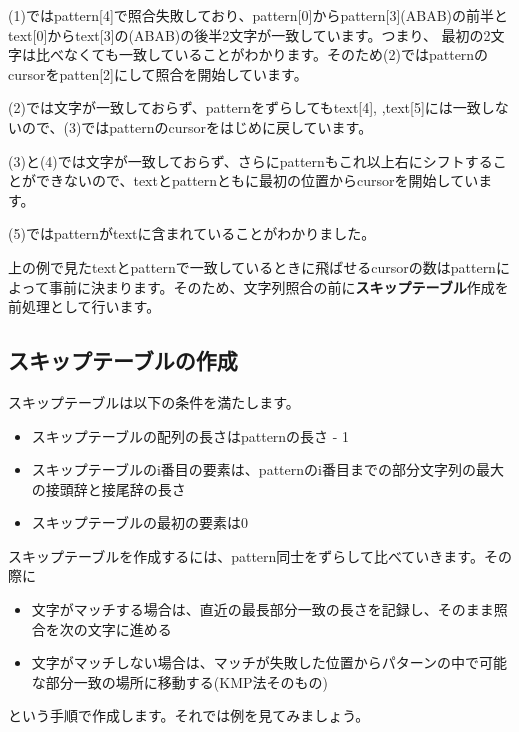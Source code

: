 \documentclass{jlreq}
\begin{document}
\vspace{0.5cm}

(1)ではpattern[4]で照合失敗しており、pattern[0]からpattern[3](ABAB)の前半とtext[0]からtext[3]の(ABAB)の後半2文字が一致しています。つまり、
最初の2文字は比べなくても一致していることがわかります。そのため(2)ではpatternのcursorをpatten[2]にして照合を開始しています。

(2)では文字が一致しておらず、patternをずらしてもtext[4], ,text[5]には一致しないので、(3)ではpatternのcursorをはじめに戻しています。

(3)と(4)では文字が一致しておらず、さらにpatternもこれ以上右にシフトすることができないので、textとpatternともに最初の位置からcursorを開始しています。

(5)ではpatternがtextに含まれていることがわかりました。

上の例で見たtextとpatternで一致しているときに飛ばせるcursorの数はpatternによって事前に決まります。そのため、文字列照合の前に\textbf{スキップテーブル}作成を
前処理として行います。

\subsection{スキップテーブルの作成}

スキップテーブルは以下の条件を満たします。

\begin{itemize}
    \item スキップテーブルの配列の長さはpatternの長さ - 1
    \item スキップテーブルのi番目の要素は、patternのi番目までの部分文字列の最大の接頭辞と接尾辞の長さ
    \item スキップテーブルの最初の要素は0
\end{itemize}


スキップテーブルを作成するには、pattern同士をずらして比べていきます。その際に

\begin{itemize}
    \item 文字がマッチする場合は、直近の最長部分一致の長さを記録し、そのまま照合を次の文字に進める
    \item 文字がマッチしない場合は、マッチが失敗した位置からパターンの中で可能な部分一致の場所に移動する(KMP法そのもの)
\end{itemize}

という手順で作成します。それでは例を見てみましょう。
\end{document}
